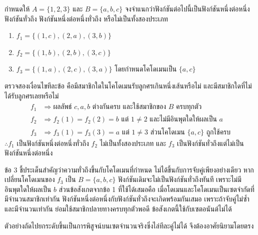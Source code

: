 \begin{ex}
\label{ex:function-classify-finite}
กำหนดให้ $A = \{1, 2, 3\}$ และ $B = \{a, b, c\}$ จงจำแนกว่าฟังก์ชันต่อไปนี้เป็นฟังก์ชันหนึ่งต่อหนึ่ง ฟังก์ชันทั่วถึง ฟังก์ชันหนึ่งต่อหนึ่งทั่วถึง หรือไม่เป็นทั้งสองประเภท
\begin{enumerate}[label=\textbf{\arabic*.}]
    \item $f_1 = \{(1,c), (2,a), (3,b)\}$
    \item $f_2 = \{(1,b), (2,b), (3,c)\}$
    \item $f_3 = \{(1,a), (2,c), (3,a)\}$ โดยกำหนดโคโดเมนเป็น $\{a, c\}$
\end{enumerate}
\end{ex}
\begin{solution}
ตรวจสองเงื่อนไขทีละข้อ คือมีสมาชิกใดในโคโดเมนรับลูกศรเกินหนึ่งเส้นหรือไม่ และมีสมาชิกใดที่ไม่ได้รับลูกศรเลยหรือไม่
\begin{align*}
f_1 &\Rightarrow \text{ผลลัพธ์ } c, a, b \text{ ต่างกันครบ และใช้สมาชิกของ } B \text{ ครบทุกตัว}\\
f_2 &\Rightarrow f_2(1) = f_2(2) = b \text{ แต่ } 1 \neq 2 \text{ และไม่มีอินพุตใดให้ผลเป็น } a\\
f_3 &\Rightarrow f_3(1) = f_3(3) = a \text{ แต่ } 1 \neq 3 \text{ ส่วนโคโดเมน } \{a,c\} \text{ ถูกใช้ครบ}
\end{align*}
$\therefore f_1$ เป็นฟังก์ชันหนึ่งต่อหนึ่งทั่วถึง $f_2$ ไม่เป็นทั้งสองประเภท และ $f_3$ เป็นฟังก์ชันทั่วถึงแต่ไม่เป็นฟังก์ชันหนึ่งต่อหนึ่ง

ข้อ 3 ชี้ประเด็นสำคัญว่าความทั่วถึงขึ้นกับโคโดเมนที่กำหนด ไม่ได้ขึ้นกับการจับคู่เพียงอย่างเดียว หากเปลี่ยนโคโดเมนของ $f_3$ เป็น $B = \{a,b,c\}$ ฟังก์ชันเดิมจะไม่เป็นฟังก์ชันทั่วถึงทันที เพราะไม่มีอินพุตใดให้ผลเป็น $b$ ส่วนข้อสังเกตจากข้อ 1 ที่ใช้ได้เสมอคือ เมื่อโดเมนและโคโดเมนเป็นเซตจำกัดที่มีจำนวนสมาชิกเท่ากัน ฟังก์ชันหนึ่งต่อหนึ่งกับฟังก์ชันทั่วถึงจะเกิดพร้อมกันเสมอ เพราะถ้าจับคู่ไม่ซ้ำและมีจำนวนเท่ากัน ย่อมใช้สมาชิกปลายทางครบทุกตัวพอดี ข้อสังเกตนี้ใช้กับเซตอนันต์ไม่ได้ \solhere
\end{solution}

ตัวอย่างถัดไปยกระดับขึ้นเป็นการพิสูจน์บนเซตจำนวนจริงซึ่งไล่ทีละคู่ไม่ได้ จึงต้องอาศัยนิยามโดยตรง

